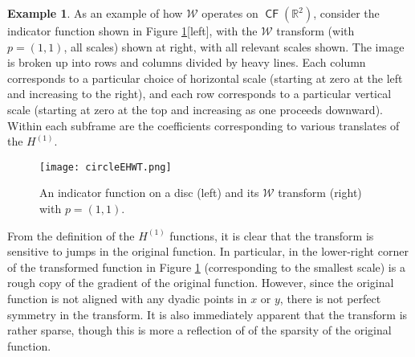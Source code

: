 \documentclass{psapm-l}
\theoremstyle{definition}
\newtheorem{example}[theorem]{Example}
\theoremstyle{remark}
\numberwithin{equation}{section}
\begin{document}
\begin{example}
As an example of how ${{\mathcal W}}$ operates on ${{{\operatorname{\mathsf{{CF}}}}}}({{\mathbb R}}^2)$, consider the indicator function shown in Figure \ref{fig:circleehwt}[left], with the ${{\mathcal W}}$ transform (with $p=(1,1)$, all scales) shown at right, with all relevant scales shown. The image is broken up into rows and columns divided by heavy lines.  Each column corresponds to a particular choice of horizontal scale (starting at zero at the left and increasing to the right), and each row corresponds to a particular vertical scale (starting at zero at the top and increasing as one proceeds downward).  Within each subframe are the coefficients corresponding to various translates of the $H^{(1)}$.
\begin{figure}[htb]
  \begin{center}
       \texttt{[image: circleEHWT.png]}
  \end{center}
  \caption{An indicator function on a disc (left) and its ${{\mathcal W}}$ transform (right) with $p=(1,1)$. }
  \label{fig:circleehwt}
\end{figure}

From the definition of the $H^{(1)}$ functions, it is clear that the transform is sensitive to jumps in the original function.  In particular, in the lower-right corner of the transformed function in Figure \ref{fig:circleehwt} (corresponding to the smallest scale) is a rough copy of the gradient of the original function. However, since the original function is not aligned with any dyadic points in $x$ or $y$, there is not perfect symmetry in the transform.  It is also immediately apparent that the transform is rather sparse, though this is more a reflection of of the sparsity of the original function.
\end{example}
\end{document}

